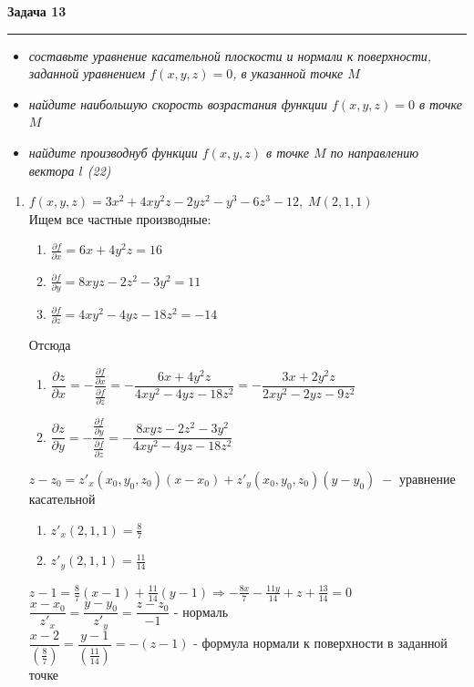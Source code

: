 \documentclass[a4paper,11pt]{article}
\begin{document}
\textbf{\large Задача 13}
\medskip\hrule\medskip
\begin{itemize}
	\item \textit{составьте уравнение касательной плоскости и нормали к поверхности, заданной уравнением $ f(x, y, z) = 0 $, в указанной точке $ M $}
	
	\item \textit{найдите наибольшую скорость возрастания функции  $ f(x, y, z) = 0 $ в точке $ M $}
	
	\item \textit{найдите производнуб функции $ f(x, y, z) $ в точке $ M $ по направлению вектора $ l $ \quad (22)}
\end{itemize} 
\begin{enumerate}
	\item $ f(x, y, z) = 3x^2 + 4xy^2z - 2yz^2 - y^3 - 6z^3 - 12, \; M(2, 1, 1) $ \\[4pt]
	Ищем все частные производные:
	\begin{enumerate}
		\item $
		\frac{\partial f}{\partial x} = 6x + 4y^2z =  16
		$
		
		\item $
		\frac{\partial f}{\partial y} = 8xyz - 2z^2 - 3y^2 =  11 
		$
		
		\item $
		\frac{\partial f}{\partial z} = 4xy^2 - 4yz - 18z^2  = -14 
		$
	\end{enumerate}
	Отсюда 
	\begin{enumerate}
		\item $ \dfrac{\partial z}{\partial x} = -\dfrac{\frac{\partial f}{\partial x}}{\frac{\partial f}{\partial z}} = -\dfrac{6x + 4y^2z}{4xy^2 - 4yz - 18z^2} = -\dfrac{3x + 2y^2z}{2xy^2 - 2yz - 9z^2} $
		
		\item $ \dfrac{\partial z}{\partial y} = -\dfrac{\frac{\partial f}{\partial y}}{\frac{\partial f}{\partial z}} = -\dfrac{8xyz - 2z^2 - 3y^2 }{4xy^2 - 4yz - 18z^2} $
	\end{enumerate}
	$ z - z_0 = z'_x(x_0, y_0, z_0)(x - x_0) + z'_y(x_0, y_0, z_0)(y - y_0)  \; - $ уравнение касательной
	\begin{enumerate}
		\item $ z'_x(2, 1, 1) =  \frac87 $
		
		\item $ z'_y(2, 1, 1) =  \frac{11}{14} $
		
	\end{enumerate}
	$ z - 1 = \frac87(x - 1) + \frac{11}{14}(y - 1) \Rightarrow -\frac{8x}{7} - \frac{11y}{14} + z + \frac{13}{14} = 0 $ \\[2pt]
	$ \dfrac{x - x_0}{z'_x} = \dfrac{y - y_0}{z'_y} = \dfrac{z - z_0}{-1} $ - нормаль \\[4pt]
	$ \dfrac{x - 2}{(\frac87)} =  \dfrac{y - 1}{(\frac{11}{14})} = -(z - 1) $ - формула нормали к поверхности в заданной точке
	

\end{enumerate}
\end{document}

